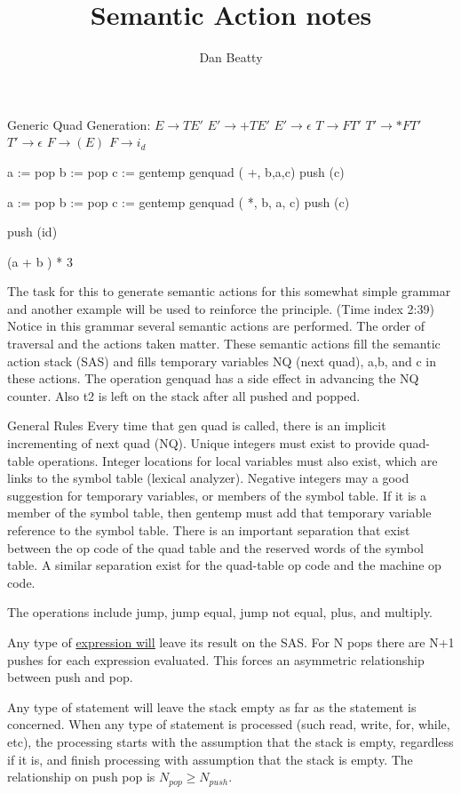 \documentclass[11pt]{article}
\title{Semantic Action notes}
\author{Dan Beatty}
\begin{document}
\maketitle
Generic Quad Generation:
$E\to TE'$
$E' \to +TE'$
$E' \to \epsilon$
$T\to FT'$
$T' \to \ast FT'$
$T' \to \epsilon$
$F \to ( E) $
$F\to i_d$

a := pop
b := pop
c := gentemp
genquad ( +, b,a,c)
push (c)

a := pop
b := pop
c := gentemp
genquad ( *, b, a, c)
push (c)

push (id)

(a + b ) * 3



The task for this to generate semantic actions for this somewhat simple grammar and another example will be used to reinforce the principle.  (Time index 2:39)  Notice in this grammar several semantic actions are performed.  The order of traversal and the actions taken matter.   These semantic actions fill the semantic action stack (SAS) and fills temporary variables NQ (next quad), a,b, and c in these actions.  The operation genquad has a side effect in advancing the NQ counter.  Also t2 is left on the stack after all pushed and popped.

General Rules 
Every time that gen quad is called, there is an implicit incrementing of next quad (NQ).  Unique integers must exist to provide quad-table operations.  Integer locations for local variables must also exist, which are links to the symbol table (lexical analyzer).  Negative integers may a good suggestion for temporary variables, or members of the symbol table.  If it is a member of the symbol table, then gentemp must add that temporary variable reference to the symbol table.  There is an important separation that exist between the op code of the quad table and the reserved words of the symbol table.  A similar separation exist for the quad-table op code and the machine op code.    

The operations include jump, jump equal, jump not equal, plus, and multiply.

Any type of \underline{expression \underline{will}} leave its result on the SAS.  For N pops there are N+1 pushes for each expression evaluated.  This forces an asymmetric relationship between push and pop.  

Any type of statement will leave the stack empty as far as the statement is concerned.   When any type of statement is processed (such read, write, for, while, etc), the processing starts with the assumption that the stack is empty,  regardless if it is, and finish processing with assumption that the stack is empty.   The relationship on push pop is $N_{pop} \ge N_{push}$.
\end{document}
